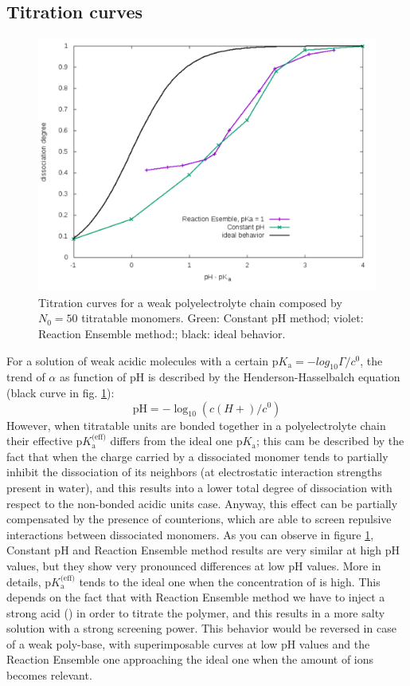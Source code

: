 \documentclass[
a4paper,                        %
11pt,                           %
twoside,                        %
footsepline,                    %
headsepline,                    %
headexclude,                    %
footexclude,                    %
pagesize,                       %
]{scrartcl}
\begin{document}
\subsection{Titration curves}

\begin{figure}[tb]
	\centering
	\includegraphics[scale=0.6]{figures/titration.pdf}
	\caption{Titration curves for a weak polyelectrolyte chain composed by $N_0=50$ titratable monomers. Green: Constant pH method; violet: Reaction Ensemble method:; black: ideal behavior.}
	\label{titration}
\end{figure}

For a solution of weak acidic molecules with a certain $\text{p}K_\text{a}=-log_{10}{\Gamma/c^0}$, the trend of $\alpha$ as function of pH is described by the Henderson-Hasselbalch equation (black curve in fig. \ref{titration}):
\begin{equation}
\text{pH} = -\log_{10}(c(H+)/c^0)
\end{equation}
However, when titratable units are bonded together in a polyelectrolyte chain their effective $\text{p}K_\text{a}^\text{(eff)}$ differs from the ideal one $\text{p}K_\text{a}$; this cam be described by the fact that when the charge carried by a dissociated monomer tends to partially inhibit the dissociation of its neighbors (at electrostatic interaction strengths present in water), and this results into a lower total degree of dissociation with respect to the non-bonded acidic units case. Anyway, this effect can be partially compensated by the presence of counterions, which are able to  screen repulsive interactions between dissociated monomers. As you can observe in figure \ref{titration}, Constant pH and Reaction Ensemble method results are very similar at high pH values, but they show very pronounced differences at low pH values. More in details, $\text{p}K_\text{a}^\text{(eff)}$ tends to the ideal one when the concentration of  is high. This depends on the fact that with Reaction Ensemble method we have to inject a strong acid () in order to titrate the polymer, and this results in a more salty solution with a strong screening power. This behavior would be reversed in case of a weak poly-base, with superimposable curves at low pH values and the Reaction Ensemble one approaching the ideal one when the amount of  ions becomes relevant.
 
\end{document}
